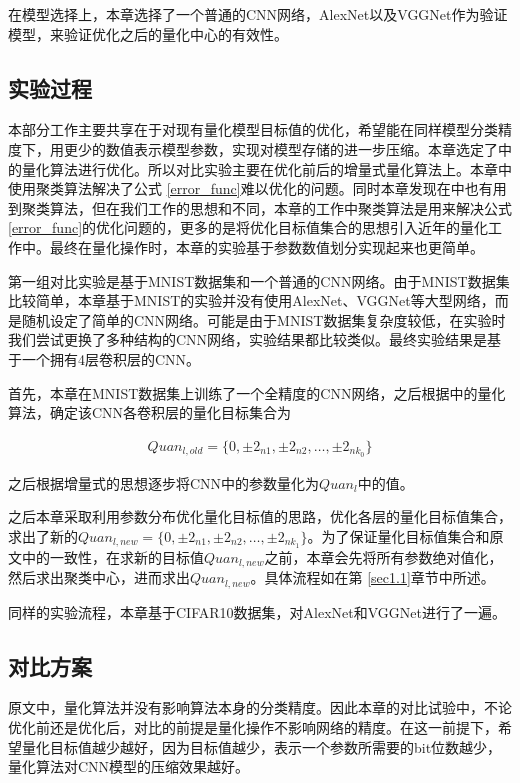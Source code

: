 \documentclass[ pdftex, oneside, master]{NJUthesis}
\begin{document}
在模型选择上，本章选择了一个普通的CNN网络，AlexNet以及VGGNet作为验证模型，来验证优化之后的量化中心的有效性。

\subsection{实验过程}

本部分工作主要共享在于对现有量化模型目标值的优化，希望能在同样模型分类精度下，用更少的数值表示模型参数，实现对模型存储的进一步压缩。本章选定了\cite{incremental}中的量化算法进行优化。所以对比实验主要在优化前后的增量式量化算法上。本章中使用聚类算法解决了公式 \ref{error_func}难以优化的问题。同时本章发现在\cite{18incre}中也有用到聚类算法，但在我们工作的思想和\cite{18incre}不同，本章的工作中聚类算法是用来解决公式 \ref{error_func}的优化问题的，更多的是将优化目标值集合的思想引入近年的量化工作中。最终在量化操作时，本章的实验基于参数数值划分实现起来也更简单。

第一组对比实验是基于MNIST数据集和一个普通的CNN网络。由于MNIST数据集比较简单，本章基于MNIST的实验并没有使用AlexNet、VGGNet等大型网络，而是随机设定了简单的CNN网络。可能是由于MNIST数据集复杂度较低，在实验时我们尝试更换了多种结构的CNN网络，实验结果都比较类似。最终实验结果是基于一个拥有4层卷积层的CNN。

首先，本章在MNIST数据集上训练了一个全精度的CNN网络，之后根据\cite{incremental}中的量化算法，确定该CNN各卷积层的量化目标集合为

\begin{eqnarray}
Quan_{l,old} = \{0, \pm2_{n1}, \pm2_{n2} , \dots, \pm2_{nk_0}  \}
\end{eqnarray}

\noindent 之后根据增量式的思想逐步将CNN中的参数量化为$Quan_l$中的值。

之后本章采取利用参数分布优化量化目标值的思路，优化各层的量化目标值集合，求出了新的$Quan_{l,new} = \{0, \pm2_{n1}, \pm2_{n2} , \dots, \pm2_{nk_1} \}$。为了保证量化目标值集合和原文\cite{incremental}中的一致性，在求新的目标值$Quan_{l,new}$之前，本章会先将所有参数绝对值化，然后求出聚类中心，进而求出$Quan_{l,new}$。具体流程如在第 \ref{sec1.1}章节中所述。

同样的实验流程，本章基于CIFAR10数据集，对AlexNet和VGGNet进行了一遍。

\subsection{对比方案}

原文\cite{incremental}中，量化算法并没有影响算法本身的分类精度。因此本章的对比试验中，不论优化前还是优化后，对比的前提是量化操作不影响网络的精度。在这一前提下，希望量化目标值越少越好，因为目标值越少，表示一个参数所需要的bit位数越少，量化算法对CNN模型的压缩效果越好。
\end{document}
